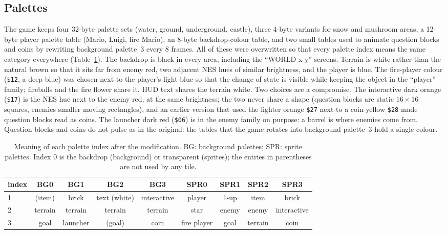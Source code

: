 \documentclass{article}
\newcommand{\hex}[1]{\texttt{\$#1}}
\begin{document}
\subsection{Palettes}
\label{sec:palettes}

The game keeps four 32-byte palette sets (water, ground, underground, castle), three 4-byte
variants for snow and mushroom areas, a 12-byte player palette table (Mario, Luigi, fire Mario),
an 8-byte backdrop-colour table, and two small tables used to animate question blocks and coins by
rewriting background palette~3 every 8 frames. All of these were overwritten so that every
palette index means the same category everywhere (Table~\ref{tab:palettes}). The backdrop is
black in every area, including the ``WORLD x-y'' screens. Terrain is white rather than the
natural brown so that it sits far from enemy red, two adjacent NES hues of similar brightness,
and the player is blue. The fire-player colour (\hex{12}, a deep blue) was chosen next to the
player's light blue so that the change of state is visible while keeping the object in the
``player'' family; fireballs and the fire flower share it. HUD text shares the terrain white.
Two choices are a compromise. The interactive dark orange (\hex{17}) is the NES hue next to the
enemy red, at the same brightness; the two never share a shape (question blocks are static
$16\times16$ squares, enemies smaller moving rectangles), and an earlier version that used the
lighter orange \hex{27} next to a coin yellow \hex{28} made question blocks read as coins. The
launcher dark red (\hex{06}) is in the enemy family on purpose: a barrel is where enemies come
from. Question blocks and coins do not pulse as in the original: the tables that the game rotates
into background palette~3 hold a single colour.

\begin{table}[t]
  \caption{Meaning of each palette index after the modification. BG: background palettes; SPR:
  sprite palettes. Index 0 is the backdrop (background) or transparent (sprites); the entries in
  parentheses are not used by any tile.}
  \centering
  \small
  \begin{tabular}{lcccccccc}
    \toprule
    index & BG0 & BG1 & BG2 & BG3 & SPR0 & SPR1 & SPR2 & SPR3 \\
    \midrule
    1 & (item) & brick & text (white) & interactive & player & 1-up & item & brick \\
    2 & terrain & terrain & terrain & terrain & star & enemy & enemy & interactive \\
    3 & goal & launcher & (goal) & coin & fire player & goal & terrain & coin \\
    \bottomrule
  \end{tabular}
  \label{tab:palettes}
\end{table}
\end{document}
